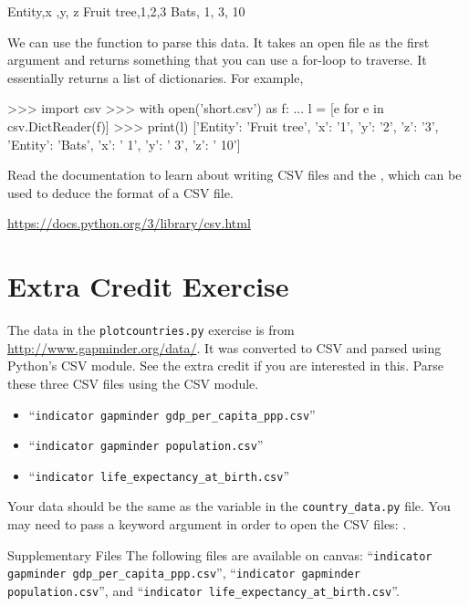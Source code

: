 \documentclass[11pt]{cselabheader}
\begin{document}
\begin{verbatimcode}
Entity,x         ,y,  z
Fruit tree,1,2,3
Bats, 1, 3, 10
\end{verbatimcode}

We can use the  function to parse this data.
It takes an open file as the first argument and returns something that you
can use a for-loop to traverse. It essentially returns a list of dictionaries.
For example,

\begin{pyconcode}
>>> import csv
>>> with open('short.csv') as f:
...     l = [e for e in csv.DictReader(f)]
>>> print(l)
[{'Entity': 'Fruit tree', 'x': '1', 'y': '2', 'z': '3'},
 {'Entity': 'Bats', 'x': ' 1', 'y': ' 3', 'z': ' 10'}]
\end{pyconcode}

Read the documentation to learn about writing CSV files and the
, which can be used to deduce the format of
a CSV file.

\begin{center}
\url{https://docs.python.org/3/library/csv.html}
\end{center}

\section{Extra Credit Exercise}
\begin{extraex}[parsecsv.py]
The data in the \texttt{plotcountries.py} exercise is from
\url{http://www.gapminder.org/data/}. It was converted to CSV and
parsed using Python's CSV module. See the extra credit if you are
interested in this.  Parse these three CSV files using the CSV module.

\begin{itemize}
\item ``\texttt{indicator gapminder gdp\_per\_capita\_ppp.csv}''
\item ``\texttt{indicator gapminder population.csv}''
\item ``\texttt{indicator life\_expectancy\_at\_birth.csv}''
\end{itemize}

Your data should be the same as the  variable in
the \texttt{country\_data.py} file. You may need to pass a keyword
argument in order to open the CSV files: .
\end{extraex}

\begin{infobox}{Supplementary Files}
The following files are available on canvas:
``\texttt{indicator gapminder gdp\_per\_capita\_ppp.csv}'',
``\texttt{indicator gapminder population.csv}'',
and ``\texttt{indicator life\_expectancy\_at\_birth.csv}''.
\end{infobox}
\end{document}
